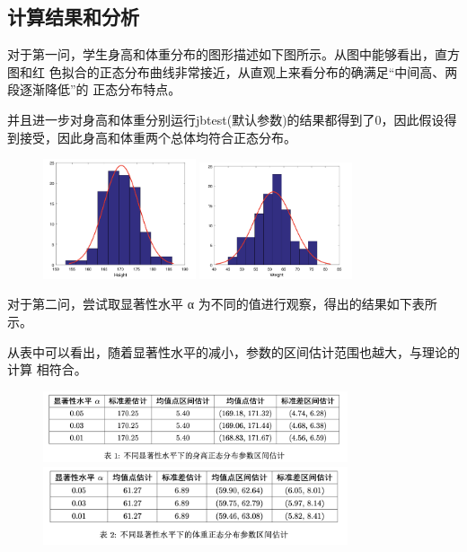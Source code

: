 \documentclass{article}
\begin{document}
\subsection{计算结果和分析}

对于第一问，学生身高和体重分布的图形描述如下图所示。从图中能够看出，直方图和红 色拟合的正态分布曲线非常接近，从直观上来看分布的确满足“中间高、两段逐渐降低”的 正态分布特点。

并且进一步对身高和体重分别运行jbtest(默认参数)的结果都得到了0，因此假设得到接受，因此身高和体重两个总体均符合正态分布。

\begin{figure}[H]
    \centering
    \includegraphics[width=0.4\textwidth]{pic1.png}
    \includegraphics[width=0.4\textwidth]{pic2.png}
\end{figure}

对于第二问，尝试取显著性水平 α 为不同的值进行观察，得出的结果如下表所示。

从表中可以看出，随着显著性水平的减小，参数的区间估计范围也越大，与理论的计算 相符合。

\begin{figure}[H]
    \centering
    \includegraphics[width=0.8\textwidth]{pic3.png}
    \includegraphics[width=0.8\textwidth]{pic4.png}
\end{figure}
\end{document}
